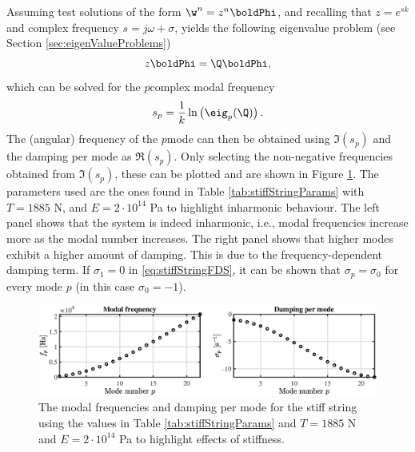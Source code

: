 {Assuming test solutions of the form $\w^n = z^n\boldPhi$, and recalling that $z=e^{sk}$ and complex frequency $s = j\omega + \sigma$, yields the following eigenvalue problem (see Section \ref{sec:eigenValueProblems})
\begin{equation}
    z\boldPhi = \Q \boldPhi,
\end{equation}
which can be solved for the $p$\th complex modal frequency
\begin{equation}
    s_p = \frac{1}{k}\ln \left(\eig_p(\Q)\right).
\end{equation}
The (angular) frequency of the $p$\th mode can then be obtained using $\mathfrak{I}(s_p)$ and the damping per mode as $\mathfrak{R}(s_p)$. Only selecting the non-negative frequencies obtained from $\mathfrak{I}(s_p)$, these can be plotted and are shown in Figure \ref{fig:modesStiffString}. The parameters used are the ones found in Table \ref{tab:stiffStringParams} with $T = 1885$ N, and $E = 2\cdot 10^{14}$ Pa to highlight inharmonic behaviour. The left panel shows that the system is indeed inharmonic, i.e., modal frequencies increase more as the modal number increases. The right panel shows that higher modes exhibit a higher amount of damping. This is due to the frequency-dependent damping term. If $\sigma_1 = 0$ in \eqref{eq:stiffStringFDS}, it can be shown that $\sigma_p = \sigma_0$ for every mode $p$ (in this case $\sigma_0 = -1$).

\begin{figure}[h]
    \centering
    \includegraphics[width=\textwidth]{figures/resonators/modesStiffString.eps}
    \caption{The modal frequencies and damping per mode for the stiff string using the values in Table \ref{tab:stiffStringParams} and $T = 1885$ N and $E = 2\cdot 10^{14}$ Pa to highlight effects of stiffness. %
    \label{fig:modesStiffString}}
\end{figure}

}
